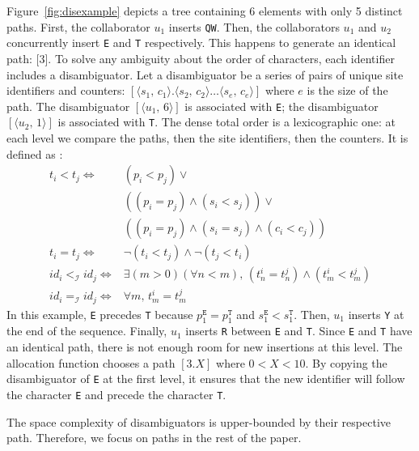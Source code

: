 Figure~\ref{fig:disexample} depicts a tree containing 6 elements with only 5
distinct paths. First, the collaborator $u_1$ inserts \texttt{QW}.  Then, the
collaborators $u_1$ and $u_2$ concurrently insert \texttt{E} and \texttt{T}
respectively. This happens to generate an identical path: [$3$]. To solve any
ambiguity about the order of characters, each identifier includes a
disambiguator.  Let a disambiguator be a series of pairs of unique site
identifiers and counters:
$[\langle s_1,\, c_1 \rangle.\langle s_2,\, c_2 \rangle \ldots \langle s_e,\,
c_e \rangle]$
where $e$ is the size of the path.  The disambiguator
$[\langle u_1,\, 6\rangle]$ is associated with \texttt{E}; the disambiguator
$[\langle u_2,\, 1\rangle]$ is associated with \texttt{T}. The dense total order
is a lexicographic one: at each level we compare the paths, then the site
identifiers, then the counters. It is defined as :
\begin{align*}
  t_i < t_j \iff & (p_i < p_j) \vee \\
                 & ((p_i = p_j) \wedge (s_i<s_j)) \vee \\
                 & ((p_i = p_j) \wedge (s_i = s_j) \wedge (c_i < c_j)) \\
  t_i = t_j \iff & \neg (t_i < t_j) \wedge \neg (t_j < t_i) \\
  id_i <_\mathcal{I} id_j \iff & \exists (m > 0)(\forall n < m),\, (t^i_n = t^j_n) \wedge                             (t^i_m < t^j_m) \\
  id_i =_\mathcal{I} id_j \iff & \forall m,\, t^i_m = t^j_m
\end{align*}
In this example, \texttt{E} precedes \texttt{T} because
$p^\texttt{E}_1=p^\texttt{T}_1$ and $s^\texttt{E}_1 < s^\texttt{T}_1$. Then,
$u_1$ inserts \texttt{Y} at the end of the sequence. Finally, $u_1$ inserts
\texttt{R} between \texttt{E} and \texttt{T}. Since \texttt{E} and \texttt{T}
have an identical path, there is not enough room for new insertions at this
level. The allocation function chooses a path $[3.X]$ where $0<X<10$. By copying
the disambiguator of \texttt{E} at the first level, it ensures that the new
identifier will follow the character \texttt{E} and precede the character
\texttt{T}.

The space complexity of disambiguators is upper-bounded by their respective
path. Therefore, we focus on paths in the rest of the paper.


